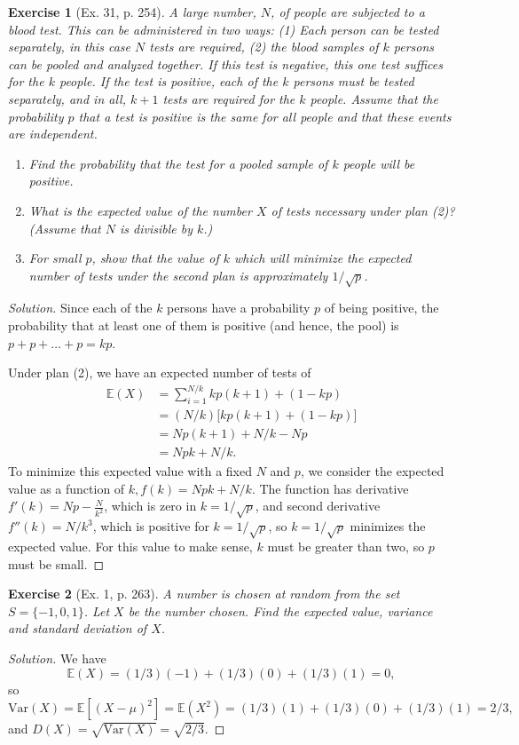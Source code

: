\documentclass[letterpaper, 10 pt, conference]{article}
\newtheorem{ex}{Exercise}
\newcommand\E{\ensuremath{\mathbb{E}}}
\newcommand\V{\ensuremath{\mathrm{Var}}}
\begin{document}
\begin{ex}[Ex. 31, p. 254]
A large number, $N$, of people are subjected to a blood test. This can be administered in two ways: (1) Each person can be tested separately, in this case $N$ tests are required, (2) the blood samples of $k$ persons can be pooled and analyzed together. If this test is \textit{negative}, this one test suffices for the $k$ people. If the test is positive, each of the $k$ persons must be tested separately, and in all, $k+1$ tests are required for the $k$ people. Assume that the probability $p$ that a test is positive is the same for all people and that these events are independent.
\begin{enumerate}
	\item Find the probability that the test for a pooled sample of $k$ people will be positive. 
	\item What is the expected value of the number $X$ of tests necessary under plan (2)? (Assume that $N$ is divisible by $k$.)
	\item For small $p$, show that the value of $k$ which will minimize the expected number of tests under the second plan is approximately $1/\sqrt{p}$.
\end{enumerate}
\end{ex}
\begin{proof}[Solution]
Since each of the $k$ persons have a probability $p$ of being positive, the probability that at least one of them is positive (and hence, the pool) is $p + p + \dots + p = kp$.

Under plan (2), we have an expected number of tests of
\begin{align}
	\E(X) &= \sum_{i = 1}^{N/k} kp(k+1) + (1-kp) \\
	&= (N/k) \lbrack kp (k+1) + (1-kp)\rbrack\\
	&= Np(k+1) + N/k - Np\\
	&= Npk + N/k.
\end{align}
To minimize this expected value with a fixed $N$ and $p$, we consider the expected value as a function of $k, f(k) = Npk + N/k$. The function has derivative $f'(k) = Np - \frac{N}{k^2}$, which is zero in $k=1/\sqrt{p}$, and second derivative $f''(k) = N/k^3$, which is positive for $k = 1/\sqrt{p}$, so $k = 1/\sqrt{p}$ minimizes the expected value. For this value to make sense, $k$ must be greater than two, so $p$ must be small.
\end{proof}

\begin{ex}[Ex. 1, p. 263]
	A number is chosen at random from the set $S = \lbrace -1, 0, 1\rbrace$. Let $X$ be the number chosen. Find the expected value, variance and standard deviation of $X$. 
\end{ex}
\begin{proof}[Solution]
	We have 
	\begin{equation}
	\E(X) = (1/3)(-1) + (1/3)(0) + (1/3)(1)= 0,
	\end{equation}
	so
	\begin{equation}
		\V(X) = \E[ (X-\mu)^2] = \E(X^2) = (1/3)(1) + (1/3)(0) + (1/3)(1) = 2/3,
	\end{equation} 
	and $D(X) = \sqrt{\V(X)} = \sqrt{2/3} $.
\end{proof}
\end{document}
